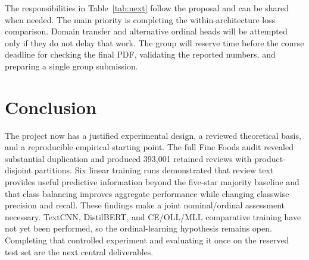 \documentclass[conference]{IEEEtran}
\begin{document}
The responsibilities in Table~\ref{tab:next} follow the proposal and can be shared when needed. The main priority is completing the within-architecture loss comparison. Domain transfer and alternative ordinal heads will be attempted only if they do not delay that work. The group will reserve time before the course deadline for checking the final PDF, validating the reported numbers, and preparing a single group submission.

\section{Conclusion}
The project now has a justified experimental design, a reviewed theoretical basis, and a reproducible empirical starting point. The full Fine Foods audit revealed substantial duplication and produced 393,001 retained reviews with product-disjoint partitions. Six linear training runs demonstrated that review text provides useful predictive information beyond the five-star majority baseline and that class balancing improves aggregate performance while changing classwise precision and recall. These findings make a joint nominal/ordinal assessment necessary. TextCNN, DistilBERT, and CE/OLL/MLL comparative training have not yet been performed, so the ordinal-learning hypothesis remains open. Completing that controlled experiment and evaluating it once on the reserved test set are the next central deliverables.



\end{document}
